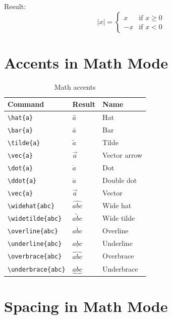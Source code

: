 Result:
\begin{equation}
    |x| =
    \begin{cases}
        x  & \text{if } x \geq 0 \\
        -x & \text{if } x < 0
    \end{cases}
\end{equation}

\section{Accents in Math Mode}

\begin{table}[H]
\centering
\begin{tabular}{lll}
\toprule
\textbf{Command} & \textbf{Result} & \textbf{Name} \\
\midrule
\verb|\hat{a}|     & $\hat{a}$     & Hat \\
\verb|\bar{a}|     & $\bar{a}$     & Bar \\
\verb|\tilde{a}|   & $\tilde{a}$   & Tilde \\
\verb|\vec{a}|     & $\vec{a}$     & Vector arrow \\
\verb|\dot{a}|     & $\dot{a}$     & Dot \\
\verb|\ddot{a}|    & $\ddot{a}$    & Double dot \\
\verb|\vec{a}|     & $\vec{a}$     & Vector \\
\verb|\widehat{abc}|& $\widehat{abc}$& Wide hat \\
\verb|\widetilde{abc}|& $\widetilde{abc}$& Wide tilde \\
\verb|\overline{abc}| & $\overline{abc}$ & Overline \\
\verb|\underline{abc}| & $\underline{abc}$ & Underline \\
\verb|\overbrace{abc}| & $\overbrace{abc}$ & Overbrace \\
\verb|\underbrace{abc}|& $\underbrace{abc}$& Underbrace \\
\bottomrule
\end{tabular}
\caption{Math accents}
\end{table}

\section{Spacing in Math Mode}

